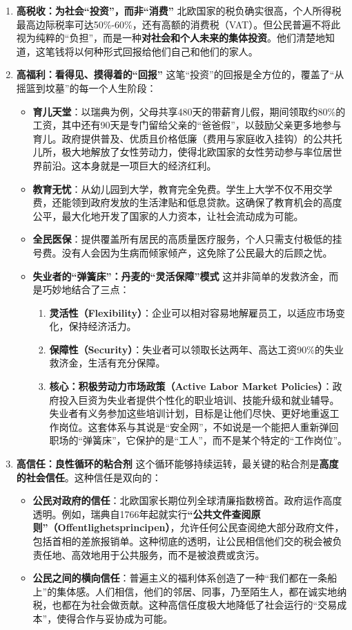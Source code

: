 \begin{enumerate}
\item \textbf{高税收：为社会“投资”，而非“消费”}
北欧国家的税负确实很高，个人所得税最高边际税率可达50\%-60\%，还有高额的消费税（VAT）。但公民普遍不将此视为纯粹的“负担”，而是一种\textbf{对社会和个人未来的集体投资}。他们清楚地知道，这笔钱将以何种形式回报给他们自己和他们的家人。
\item \textbf{高福利：看得见、摸得着的“回报”}
这笔“投资”的回报是全方位的，覆盖了“从摇篮到坟墓”的每一个人生阶段：
\begin{itemize}
\item \textbf{育儿天堂}：以瑞典为例，父母共享480天的带薪育儿假，期间领取约80\%的工资，其中还有90天是专门留给父亲的“爸爸假”，以鼓励父亲更多地参与育儿。政府提供普及、优质且价格低廉（费用与家庭收入挂钩）的公共托儿所，极大地解放了女性劳动力，使得北欧国家的女性劳动参与率位居世界前沿。这本身就是一项巨大的经济红利。
\item \textbf{教育无忧}：从幼儿园到大学，教育完全免费。学生上大学不仅不用交学费，还能领到政府发放的生活津贴和低息贷款。这确保了教育机会的高度公平，最大化地开发了国家的人力资本，让社会流动成为可能。
\item \textbf{全民医保}：提供覆盖所有居民的高质量医疗服务，个人只需支付极低的挂号费。没有人会因为生病而倾家倾产，这免除了公民最大的后顾之忧。
\item \textbf{失业者的“弹簧床”：丹麦的“灵活保障”模式}
这并非简单的发救济金，而是巧妙地结合了三点：
\begin{enumerate}
\item \textbf{灵活性（Flexibility）}：企业可以相对容易地解雇员工，以适应市场变化，保持经济活力。
\item \textbf{保障性（Security）}：失业者可以领取长达两年、高达工资90\%的失业救济金，生活有充分保障。
\item \textbf{核心：积极劳动力市场政策（Active Labor Market Policies）}：政府投入巨资为失业者提供个性化的职业培训、技能升级和就业辅导。失业者有义务参加这些培训计划，目标是让他们尽快、更好地重返工作岗位。这套体系与其说是“安全网”，不如说是一个能把人重新弹回职场的“弹簧床”，它保护的是“工人”，而不是某个特定的“工作岗位”。
\end{enumerate}
\end{itemize}
\item \textbf{高信任：良性循环的粘合剂}
这个循环能够持续运转，最关键的粘合剂是\textbf{高度的社会信任}。这种信任是双向的：
\begin{itemize}
\item \textbf{公民对政府的信任}：北欧国家长期位列全球清廉指数榜首。政府运作高度透明。例如，瑞典自1766年起就实行\textbf{“公共文件查阅原则”（Offentlighetsprincipen）}，允许任何公民查阅绝大部分政府文件，包括首相的差旅报销单。这种彻底的透明，让公民相信他们交的税会被负责任地、高效地用于公共服务，而不是被浪费或贪污。
\item \textbf{公民之间的横向信任}：普遍主义的福利体系创造了一种“我们都在一条船上”的集体感。人们相信，他们的邻居、同事，乃至陌生人，都在诚实地纳税，也都在为社会做贡献。这种高信任度极大地降低了社会运行的“交易成本”，使得合作与妥协成为可能。
\end{itemize}
\end{enumerate}

